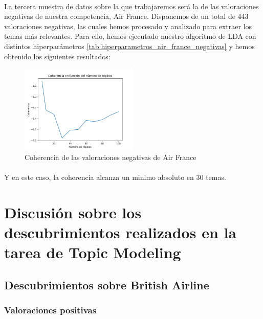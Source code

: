 \documentclass{report}
\begin{document}
{{                    \paragraph*{}{
                        La tercera muestra de datos sobre la que trabajaremos será la de las valoraciones negativas de nuestra competencia, Air France.
                        Disponemos de un total de 443 valoraciones negativas, las cuales hemos procesado y analizado para extraer los temas más relevantes.
                        Para ello, hemos ejecutado nuestro algoritmo de LDA con distintos hiperparámetros \ref{tab:hiperparametros_air_france_negativas} y hemos obtenido los siguientes resultados:
                    }
                    \begin{figure}[H]
                        \centering
                        \includegraphics[width=0.5\textwidth]{./img/air_france_negativas.png}
                        \caption{Coherencia de las valoraciones negativas de Air France}
                    \end{figure}
                    \paragraph*{}{
                        Y en este caso, la coherencia alcanza un minimo absoluto en 30 temas.
                    }
        \clearpage\section{Discusión sobre los descubrimientos realizados en la tarea de Topic Modeling}
            \subsection{Descubrimientos sobre British Airline}
                \subsubsection*{Valoraciones positivas}
}}
\end{document}
